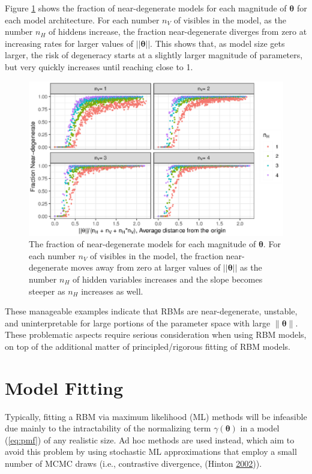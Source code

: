 \documentclass[12pt]{article}
\theoremstyle{definition}
\newcommand{\nv}{{n_{\scriptscriptstyle V}}}
\newcommand{\nh}{{n_{\scriptscriptstyle H}}}
\begin{document}
Figure \ref{fig:split-plots-dist} shows the fraction of near-degenerate
models for each magnitude of \(\boldsymbol \theta\) for each model
architecture. For each number \(\nv\) of visibles in the model, as the
number \(\nh\) of hiddens increase, the fraction near-degenerate
diverges from zero at increasing rates for larger values of
\(||\boldsymbol \theta||\). This shows that, as model size gets larger,
the risk of degeneracy starts at a slightly larger magnitude of
parameters, but very quickly increases until reaching close to 1. \par
\begin{figure}
\includegraphics{paper_files/figure-latex/split-plots-dist-1} \caption{The fraction of near-degenerate models for each magnitude of $\boldsymbol \theta$. For each number $\nv$ of visibles in the model, the fraction near-degenerate moves away from zero at larger values of $||\boldsymbol \theta||$ as the number $\nh$ of hidden variables increases and the slope becomes steeper as $\nh$ increases as well.}\label{fig:split-plots-dist}
\end{figure}
These manageable examples indicate that RBMs are near-degenerate,
unstable, and uninterpretable for large portions of the parameter space
with large \(\|\boldsymbol \theta\|\). These problematic aspects require
serious consideration when using RBM models, on top of the additional
matter of principled/rigorous fitting of RBM models.

\section{Model Fitting}\label{model-fitting}

Typically, fitting a RBM via maximum likelihood (ML) methods will be
infeasible due mainly to the intractability of the normalizing term
\(\gamma(\boldsymbol \theta)\) in a model (\eqref{eq:pmf}) of any
realistic size. Ad hoc methods are used instead, which aim to avoid this
problem by using stochastic ML approximations that employ a small number
of MCMC draws (i.e., contrastive divergence, (Hinton
\protect\hyperlink{ref-hinton2002training}{2002})).
\end{document}
